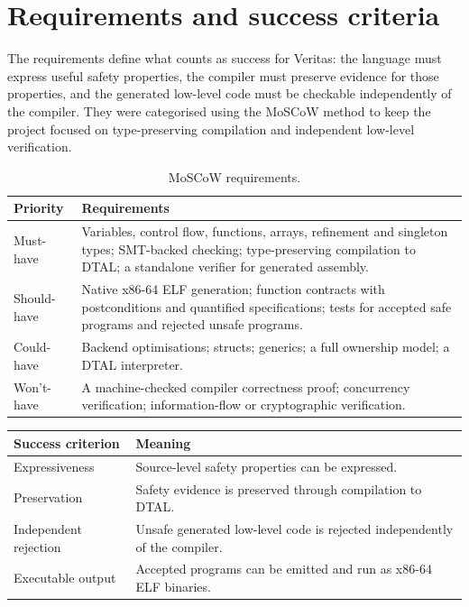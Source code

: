 \section{Requirements and success criteria}\label{sec:requirements-anal}

The requirements define what counts as success for Veritas: the language must express useful safety properties, the compiler must preserve evidence for those properties, and the generated low-level code must be checkable independently of the compiler. They were categorised using the MoSCoW method to keep the project focused on type-preserving compilation and independent low-level verification.

\begin{table}[H]
  \centering
  \small
  \begin{tabularx}{0.94\textwidth}{>{\raggedright\arraybackslash}p{} >{\raggedright\arraybackslash}X}
    \hline
    \textbf{Priority} & \textbf{Requirements} \\
    \hline
    Must-have & Variables, control flow, functions, arrays, refinement and singleton types; SMT-backed checking; type-preserving compilation to DTAL; a standalone verifier for generated assembly. \\
    Should-have & Native x86-64 ELF generation; function contracts with postconditions and quantified specifications; tests for accepted safe programs and rejected unsafe programs. \\
    Could-have & Backend optimisations; structs; generics; a full ownership model; a DTAL interpreter. \\
    Won't-have & A machine-checked compiler correctness proof; concurrency verification; information-flow or cryptographic verification. \\
    \hline
  \end{tabularx}
  \caption{MoSCoW requirements.}
  \label{tab:moscow-requirements}
\end{table}

\begin{center}
\small
\begin{tabularx}{0.94\textwidth}{>{\raggedright\arraybackslash}p{} >{\raggedright\arraybackslash}X}
\toprule
\textbf{Success criterion} & \textbf{Meaning} \\
\midrule
Expressiveness & Source-level safety properties can be expressed. \\
Preservation & Safety evidence is preserved through compilation to DTAL. \\
Independent rejection & Unsafe generated low-level code is rejected independently of the compiler. \\
Executable output & Accepted programs can be emitted and run as x86-64 ELF binaries. \\
\bottomrule
\end{tabularx}
\end{center}

